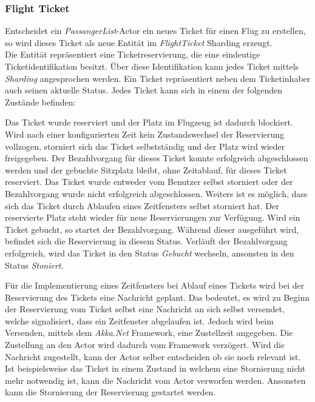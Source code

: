 \subsubsection{Flight Ticket}
Entscheidet ein \textit{PassangerList}-Actor ein neues Ticket für einen Flug zu erstellen, so wird dieses Ticket als neue Entität im \textit{FlightTicket} Sharding erzeugt. \\
Die Entität repräsentiert eine Ticketreservierung, die eine eindeutige Ticketidentifikation besitzt. Über diese Identifikation kann jedes Ticket mittels \textit{Sharding} angesprochen werden. Ein Ticket repräsentiert neben dem Ticketinhaber auch seinen aktuelle Status. Jedes Ticket kann sich in einem der folgenden Zustände befinden:
\begin{enumerate}
     Das Ticket wurde reserviert und der Platz im Flugzeug ist dadurch blockiert. Wird nach einer konfigurierten Zeit kein Zustandswechsel der Reservierung vollzogen, storniert sich das Ticket selbstständig und der Platz wird wieder freigegeben.
     Der Bezahlvorgang für dieses Ticket konnte erfolgreich abgeschlossen werden und der gebuchte Sitzplatz bleibt, ohne Zeitablauf, für dieses Ticket reserviert.
     Das Ticket wurde entweder vom Benutzer selbst storniert oder der Bezahlvorgang wurde nicht erfolgreich abgeschlossen. Weiters ist es möglich, dass sich das Ticket durch Ablaufen eines Zeitfensters selbst storniert hat. Der reservierte Platz steht wieder für neue Reservierungen zur Verfügung.
     Wird ein Ticket gebucht, so startet der Bezahlvorgang. Während dieser ausgeführt wird, befindet sich die Reservierung in diesem Status. Verläuft der Bezahlvorgang erfolgreich, wird das Ticket in den Status \textit{Gebucht} wechseln, ansonsten in den Status \textit{Stoniert}.
\end{enumerate}
Für die Implementierung eines Zeitfensters bei Ablauf eines Tickets wird bei der Reservierung des Tickets eine Nachricht geplant. 
Das bedeutet, es wird zu Beginn der Reservierung vom Ticket selbst eine Nachricht an sich selbst versendet, welche signalisiert, dass ein Zeitfenster abgelaufen ist. Jedoch wird beim Versenden, mittels dem \textit{Akka.Net} Framework, eine Zustellzeit angegeben. Die Zustellung an den Actor wird dadurch vom Framework verzögert. Wird die Nachricht zugestellt, kann der Actor selber entscheiden ob sie noch relevant ist. Ist beispielsweise das Ticket in einem Zustand in welchem eine Stornierung nicht mehr notwendig ist, kann die Nachricht vom Actor verworfen werden. Ansonsten kann die Stornierung der Reservierung gestartet werden. \\


